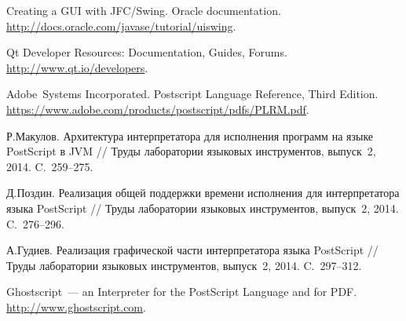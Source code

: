 \begin{thebibliography}{99}

   Creating a GUI with JFC/Swing. Oracle documentation. \url{http://docs.oracle.com/javase/tutorial/uiswing}.

   Qt Developer Resources: Documentation, Guides, Forums. \url{http://www.qt.io/developers}.

   Adobe~Systems Incorporated. Postscript Language Reference, Third Edition.
  \url{https://www.adobe.com/products/postscript/pdfs/PLRM.pdf}.

  Р.Макулов. Архитектура интерпретатора для исполнения программ на языке PostScript в JVM //
  Труды лаборатории языковых инструментов, выпуск~2, 2014. C.~259--275.

  Д.Поздин. Реализация общей поддержки времени исполнения для интерпретатора языка
  PostScript // Труды лаборатории языковых инструментов, выпуск~2, 2014. C.~276--296.

  А.Гудиев. Реализация графической части интерпретатора языка PostScript //
  Труды лаборатории языковых инструментов, выпуск~2, 2014. C.~297--312.

  Ghostscript~--- an Interpreter for the PostScript Language and for PDF.
  \url{http://www.ghostscript.com}.
\end{thebibliography}
